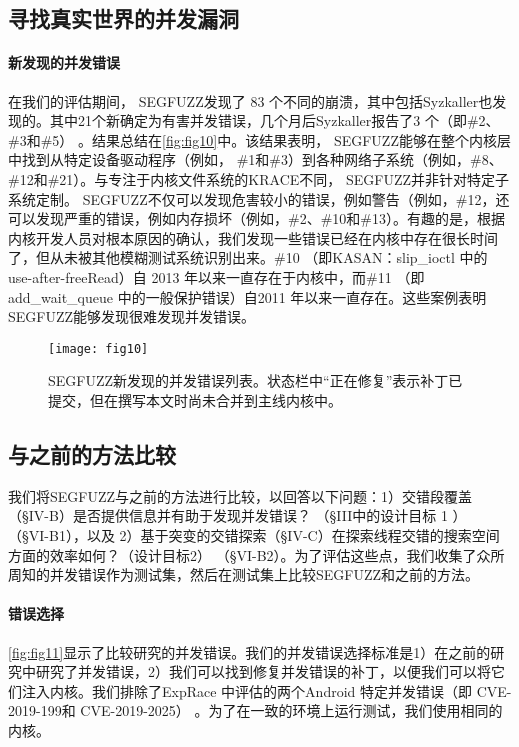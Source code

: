\subsection{寻找真实世界的并发漏洞}
\paragraph{新发现的并发错误}在我们的评估期间， SEGFUZZ发现了 83 个不同的崩溃，其中包括Syzkaller也发现的。其中21个新确定为有害并发错误，几个月后Syzkaller报告了3 个（即\#2、 \#3和\#5） 。结果总结在\autoref{fig:fig10}中。该结果表明， SEGFUZZ能够在整个内核层中找到从特定设备驱动程序（例如， \#1和\#3）到各种网络子系统（例如，\#8、\#12和\#21）。与专注于内核文件系统的KRACE不同， SEGFUZZ并非针对特定子系统定制。 SEGFUZZ不仅可以发现危害较小的错误，例如警告（例如，\#12，还可以发现严重的错误，例如内存损坏（例如，\#2、\#10和\#13）。有趣的是，根据内核开发人员对根本原因的确认，我们发现一些错误已经在内核中存在很长时间了，但从未被其他模糊测试系统识别出来。\#10 （即KASAN：slip\_ioctl 中的 use-after-freeRead）自 2013 年以来一直存在于内核中，而\#11 （即add\_wait\_queue 中的一般保护错误）自2011 年以来一直存在。这些案例表明SEGFUZZ能够发现很难发现并发错误。

\begin{figure}[ht]
    \centering
    \texttt{[image: fig10]}
    \caption{\label{fig:fig10}SEGFUZZ新发现的并发错误列表。状态栏中“正在修复”表示补丁已提交，但在撰写本文时尚未合并到主线内核中。}
\end{figure}

\subsection{与之前的方法比较}

我们将SEGFUZZ与之前的方法进行比较，以回答以下问题：1）交错段覆盖（§IV-B）是否提供信息并有助于发现并发错误？ （§III中的设计目标 1 ） （§VI-B1），以及 2）基于突变的交错探索（§IV-C）在探索线程交错的搜索空间方面的效率如何？（设计目标2） （§VI-B2）。为了评估这些点，我们收集了众所周知的并发错误作为测试集，然后在测试集上比较SEGFUZZ和之前的方法。

\paragraph{错误选择}\autoref{fig:fig11}显示了比较研究的并发错误。我们的并发错误选择标准是1）在之前的研究中研究了并发错误，2）我们可以找到修复并发错误的补丁，以便我们可以将它们注入内核。我们排除了ExpRace 中评估的两个Android 特定并发错误（即 CVE-2019-199和 CVE-2019-2025） 。为了在一致的环境上运行测试，我们使用相同的内核。

